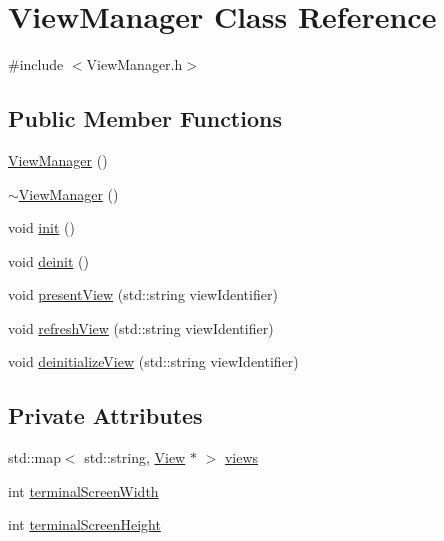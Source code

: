\hypertarget{class_view_manager}{}\section{View\+Manager Class Reference}
\label{class_view_manager}


{\ttfamily \#include $<$View\+Manager.\+h$>$}

\subsection*{Public Member Functions}
\begin{DoxyCompactItemize}
\item 
\mbox{\hyperlink{class_view_manager_a0f78a0547f1946a9e19aa28d926ba152}{View\+Manager}} ()
\item 
\mbox{\hyperlink{class_view_manager_ad80032be506a890da62d887f1c9c050c}{$\sim$\+View\+Manager}} ()
\item 
void \mbox{\hyperlink{class_view_manager_aa75748b42456f684282f05100f5b1f60}{init}} ()
\item 
void \mbox{\hyperlink{class_view_manager_a11d585d66a93b18c1c8c7eceaefb2649}{deinit}} ()
\item 
void \mbox{\hyperlink{class_view_manager_a469f00e975467f23e032b66bd7a09567}{present\+View}} (std\+::string view\+Identifier)
\item 
void \mbox{\hyperlink{class_view_manager_a41c32cebd2cddb4df366d973947ba29b}{refresh\+View}} (std\+::string view\+Identifier)
\item 
void \mbox{\hyperlink{class_view_manager_aa8061fbef65c06d1b72cb87673a9bf13}{deinitialize\+View}} (std\+::string view\+Identifier)
\end{DoxyCompactItemize}
\subsection*{Private Attributes}
\begin{DoxyCompactItemize}
\item 
std\+::map$<$ std\+::string, \mbox{\hyperlink{class_view}{View}} $\ast$ $>$ \mbox{\hyperlink{class_view_manager_aaaa35009bf79352cab4cc1a66555e121}{views}}
\item 
int \mbox{\hyperlink{class_view_manager_afd822cc38db72bc8039a65563d5b913f}{terminal\+Screen\+Width}}
\item 
int \mbox{\hyperlink{class_view_manager_a617dd7697c4745c59b36f5084e4d7201}{terminal\+Screen\+Height}}
\end{DoxyCompactItemize}


